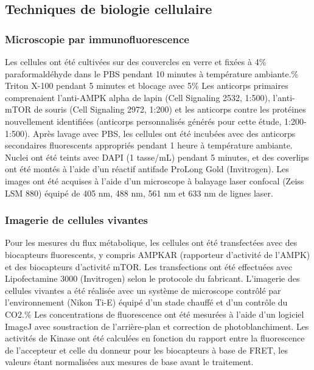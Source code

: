 \documentclass[11pt,a4paper]{article}
\begin{document}
\subsection{Techniques de biologie cellulaire}

\subsubsection{Microscopie par immunofluorescence}

Les cellules ont été cultivées sur des couvercles en verre et fixées à 4\% paraformaldéhyde dans le PBS pendant 10 minutes à température ambiante.\% Triton X-100 pendant 5 minutes et blocage avec 5\% Les anticorps primaires comprenaient l'anti-AMPK alpha de lapin (Cell Signaling 2532, 1:500), l'anti-mTOR de souris (Cell Signaling 2972, 1:200) et les anticorps contre les protéines nouvellement identifiées (anticorps personnalisés générés pour cette étude, 1:200-1:500). Après lavage avec PBS, les cellules ont été incubées avec des anticorps secondaires fluorescents appropriés pendant 1 heure à température ambiante. Nuclei ont été teints avec DAPI (1 tasse/mL) pendant 5 minutes, et des coverlips ont été montés à l'aide d'un réactif antifade ProLong Gold (Invitrogen). Les images ont été acquises à l'aide d'un microscope à balayage laser confocal (Zeiss LSM 880) équipé de 405 nm, 488 nm, 561 nm et 633 nm de lignes laser.

\subsubsection{Imagerie de cellules vivantes}

Pour les mesures du flux métabolique, les cellules ont été transfectées avec des biocapteurs fluorescents, y compris AMPKAR (rapporteur d'activité de l'AMPK) et des biocapteurs d'activité mTOR. Les transfections ont été effectuées avec Lipofectamine 3000 (Invitrogen) selon le protocole du fabricant. L'imagerie des cellules vivantes a été réalisée avec un système de microscope contrôlé par l'environnement (Nikon Ti-E) équipé d'un stade chauffé et d'un contrôle du CO2.\% Les concentrations de fluorescence ont été mesurées à l'aide d'un logiciel ImageJ avec soustraction de l'arrière-plan et correction de photoblanchiment. Les activités de Kinase ont été calculées en fonction du rapport entre la fluorescence de l'accepteur et celle du donneur pour les biocapteurs à base de FRET, les valeurs étant normalisées aux mesures de base avant le traitement.
\end{document}
